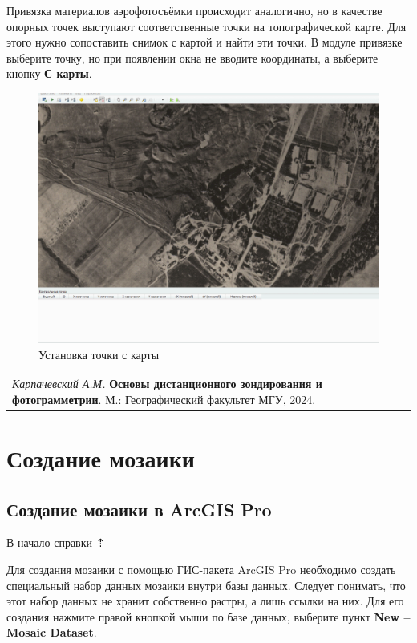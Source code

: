 \documentclass[
  12pt,
]{book}
\begin{document}
Привязка материалов аэрофотосъёмки происходит аналогично, но в качестве опорных точек выступают соответственные точки на топографической карте. Для этого нужно сопоставить снимок с картой и найти эти точки. В модуле привязке выберите точку, но при появлении окна не вводите координаты, а выберите кнопку \textbf{С карты}.

\begin{figure}
\centering
\includegraphics{images/Ref02/Reference_aerial.gif}
\caption{Установка точки с карты}
\end{figure}

\begin{longtable}[]{@{}l@{}}
\toprule\noalign{}
\endhead
\bottomrule\noalign{}
\endlastfoot
\emph{Карпачевский А.М.} \textbf{Основы дистанционного зондирования и фотограмметрии}. М.: Географический факультет МГУ, 2024. \\
\end{longtable}

\hypertarget{mosaic}{%
\chapter{Создание мозаики}\label{mosaic}}

\hypertarget{mosaic-arcgis}{%
\section{Создание мозаики в ArcGIS Pro}\label{mosaic-arcgis}}

\protect\hyperlink{mosaic}{В начало справки ⇡}

Для создания мозаики с помощью ГИС-пакета ArcGIS Pro необходимо создать специальный набор данных мозаики внутри базы данных. Следует понимать, что этот набор данных не хранит собственно растры, а лишь ссылки на них. Для его создания нажмите правой кнопкой мыши по базе данных, выберите пункт \textbf{New -- Mosaic Dataset}.
\end{document}
